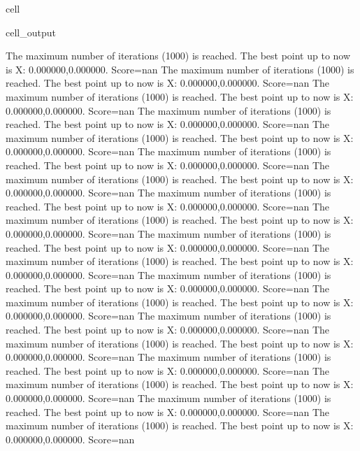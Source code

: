 \documentclass[letterpaper,10pt,english]{jupyterBook}
\begin{document}
\begin{sphinxuseclass}{cell}
\begin{sphinxVerbatimOutput}
\begin{sphinxuseclass}{cell_output}
\begin{sphinxVerbatim}[commandchars=\\\{\}]
The maximum number of iterations (1000) is reached. The best point up to now is X: \PYGZob{}0.000000,0.000000\PYGZcb{}. Score=\PYGZhy{}nan
The maximum number of iterations (1000) is reached. The best point up to now is X: \PYGZob{}0.000000,0.000000\PYGZcb{}. Score=\PYGZhy{}nan
The maximum number of iterations (1000) is reached. The best point up to now is X: \PYGZob{}0.000000,0.000000\PYGZcb{}. Score=\PYGZhy{}nan
The maximum number of iterations (1000) is reached. The best point up to now is X: \PYGZob{}0.000000,0.000000\PYGZcb{}. Score=\PYGZhy{}nan
The maximum number of iterations (1000) is reached. The best point up to now is X: \PYGZob{}0.000000,0.000000\PYGZcb{}. Score=\PYGZhy{}nan
The maximum number of iterations (1000) is reached. The best point up to now is X: \PYGZob{}0.000000,0.000000\PYGZcb{}. Score=\PYGZhy{}nan
The maximum number of iterations (1000) is reached. The best point up to now is X: \PYGZob{}0.000000,0.000000\PYGZcb{}. Score=\PYGZhy{}nan
The maximum number of iterations (1000) is reached. The best point up to now is X: \PYGZob{}0.000000,0.000000\PYGZcb{}. Score=\PYGZhy{}nan
The maximum number of iterations (1000) is reached. The best point up to now is X: \PYGZob{}0.000000,0.000000\PYGZcb{}. Score=\PYGZhy{}nan
The maximum number of iterations (1000) is reached. The best point up to now is X: \PYGZob{}0.000000,0.000000\PYGZcb{}. Score=\PYGZhy{}nan
The maximum number of iterations (1000) is reached. The best point up to now is X: \PYGZob{}0.000000,0.000000\PYGZcb{}. Score=\PYGZhy{}nan
The maximum number of iterations (1000) is reached. The best point up to now is X: \PYGZob{}0.000000,0.000000\PYGZcb{}. Score=\PYGZhy{}nan
The maximum number of iterations (1000) is reached. The best point up to now is X: \PYGZob{}0.000000,0.000000\PYGZcb{}. Score=\PYGZhy{}nan
The maximum number of iterations (1000) is reached. The best point up to now is X: \PYGZob{}0.000000,0.000000\PYGZcb{}. Score=\PYGZhy{}nan
The maximum number of iterations (1000) is reached. The best point up to now is X: \PYGZob{}0.000000,0.000000\PYGZcb{}. Score=\PYGZhy{}nan
The maximum number of iterations (1000) is reached. The best point up to now is X: \PYGZob{}0.000000,0.000000\PYGZcb{}. Score=\PYGZhy{}nan
The maximum number of iterations (1000) is reached. The best point up to now is X: \PYGZob{}0.000000,0.000000\PYGZcb{}. Score=\PYGZhy{}nan
The maximum number of iterations (1000) is reached. The best point up to now is X: \PYGZob{}0.000000,0.000000\PYGZcb{}. Score=\PYGZhy{}nan
The maximum number of iterations (1000) is reached. The best point up to now is X: \PYGZob{}0.000000,0.000000\PYGZcb{}. Score=\PYGZhy{}nan

\end{sphinxVerbatim}
\end{sphinxuseclass}
\end{sphinxVerbatimOutput}
\end{sphinxuseclass}
\end{document}
